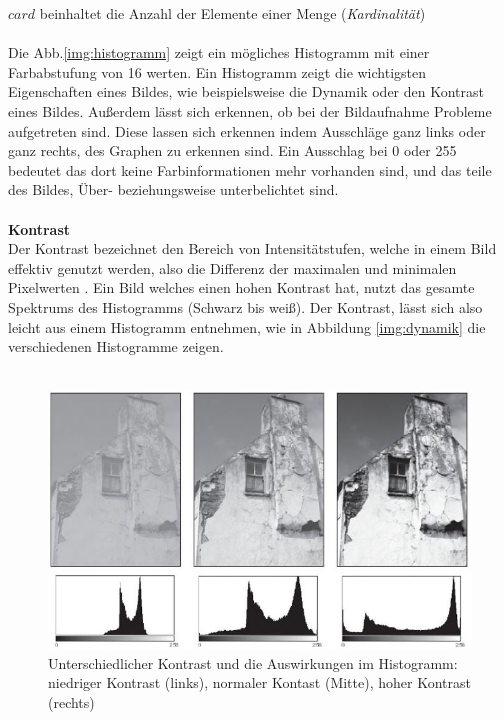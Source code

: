 \documentclass[a4paper,12pt,oneside]{article}
\begin{document}
  $card$ beinhaltet die Anzahl der Elemente einer Menge (\textit{Kardinalität})\\\\
  Die Abb.\ref{img:histogramm} zeigt ein mögliches Histogramm mit einer Farbabstufung von 16 werten. Ein Histogramm zeigt die wichtigsten Eigenschaften eines Bildes, wie beispielsweise die Dynamik oder den Kontrast eines Bildes. Außerdem lässt sich erkennen, ob bei der Bildaufnahme Probleme aufgetreten sind. Diese lassen sich erkennen indem Ausschläge ganz links oder ganz rechts, des Graphen zu erkennen sind. Ein Ausschlag bei 0 oder 255 bedeutet das dort keine Farbinformationen mehr vorhanden sind, und das teile des Bildes, Über- beziehungsweise unterbelichtet sind.\\\\
  \textbf{Kontrast}\label{s.kontrast}\\
  Der Kontrast bezeichnet den Bereich von Intensitätstufen, welche in einem Bild effektiv genutzt werden, also die Differenz der maximalen und minimalen Pixelwerten \cite[44]{burger2009digitale}. Ein Bild welches einen hohen Kontrast hat, nutzt das gesamte Spektrums des Histogramms (Schwarz bis weiß). Der Kontrast, lässt sich also leicht aus einem Histogramm entnehmen, wie in Abbildung \ref{img:dynamik} die verschiedenen Histogramme zeigen.\\\\
  \begin{figure}
    [h]
    \centering
    \includegraphics[scale=0.5]{Sources/kontrast.JPG}
    \caption{Unterschiedlicher Kontrast und die Auswirkungen im Histogramm: niedriger Kontrast (links), normaler Kontast (Mitte), hoher Kontrast (rechts)\cite[45]{burger2009digitale}}
    \label{img:kontrast}
  \end{figure}\\
\end{document}
